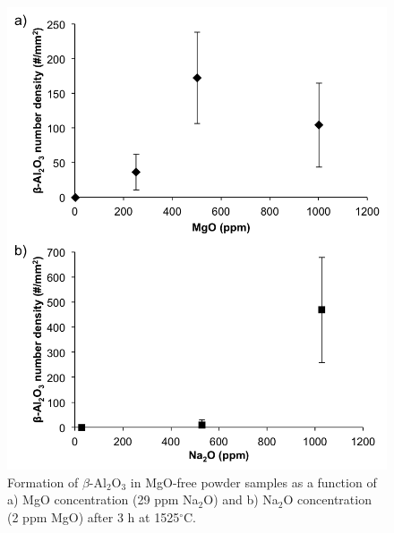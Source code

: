 \newpage
\begin{figure}[H]
	\centering
	\includegraphics{Chapter-5/Figures/Figure9.png}
	\caption{Formation of $\beta$-Al$_{2}$O$_{3}$ in MgO-free powder samples as a function of a) MgO concentration (29 ppm Na$_{2}$O) and b) Na$_{2}$O concentration (2 ppm MgO) after 3 h at 1525$^{\circ}$C.}
	\label{Ch5-figure:Figure9}
\end{figure}

